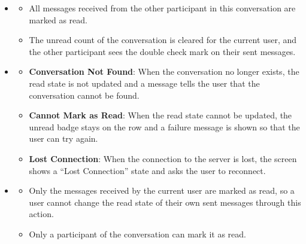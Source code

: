 \begin{itemize}[leftmargin=1.6em,topsep=4pt,itemsep=3pt,parsep=0pt,label=$\bullet$]
        \begin{itemize}[leftmargin=2.2em,topsep=2pt,itemsep=3pt,parsep=0pt,label=$\circ$]
            \item \textbf{Nothing to Read}: When the conversation has no unread message, the ``Mark as read'' action is disabled in the menu.
            \item \textbf{New Message While Reading}: When a new message arrives while the thread is open, that message is marked as read immediately.
        \end{itemize}
    \item {}

        \begin{itemize}[leftmargin=2.2em,topsep=2pt,itemsep=3pt,parsep=0pt,label=$\circ$]
            \item All messages received from the other participant in this conversation are marked as read.
            \item The unread count of the conversation is cleared for the current user, and the other participant sees the double check mark on their sent messages.
        \end{itemize}
    \item {}

        \begin{itemize}[leftmargin=2.2em,topsep=2pt,itemsep=3pt,parsep=0pt,label=$\circ$]
            \item \textbf{Conversation Not Found}: When the conversation no longer exists, the read state is not updated and a message tells the user that the conversation cannot be found.
            \item \textbf{Cannot Mark as Read}: When the read state cannot be updated, the unread badge stays on the row and a failure message is shown so that the user can try again.
            \item \textbf{Lost Connection}: When the connection to the server is lost, the screen shows a ``Lost Connection'' state and asks the user to reconnect.
        \end{itemize}
    \item {}

        \begin{itemize}[leftmargin=2.2em,topsep=2pt,itemsep=3pt,parsep=0pt,label=$\circ$]
            \item Only the messages received by the current user are marked as read, so a user cannot change the read state of their own sent messages through this action.
            \item Only a participant of the conversation can mark it as read.
        \end{itemize}
\end{itemize}

